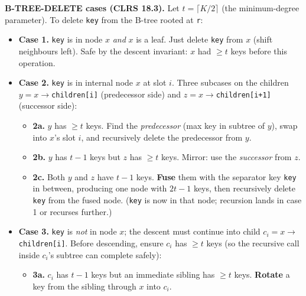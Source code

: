 \documentclass[11pt]{article}
\begin{document}
\begin{defnbox}
\textbf{B-TREE-DELETE cases (CLRS 18.3).} Let $t = \lceil K/2 \rceil$
(the minimum-degree parameter). To delete \texttt{key} from the
B-tree rooted at \texttt{r}:

\begin{itemize}[leftmargin=*]
    \item \textbf{Case 1.} \texttt{key} is in node $x$ \emph{and} $x$
          is a leaf. Just delete \texttt{key} from $x$ (shift
          neighbours left). Safe by the descent invariant: $x$ had
          $\ge t$ keys before this operation.
    \item \textbf{Case 2.} \texttt{key} is in internal node $x$ at
          slot $i$. Three subcases on the children $y =
          x\rightarrow$\texttt{children[i]} (predecessor side) and
          $z = x\rightarrow$\texttt{children[i+1]} (successor side):
          \begin{itemize}
              \item \textbf{2a.} $y$ has $\ge t$ keys. Find the
                    \emph{predecessor} (max key in subtree of $y$),
                    swap into $x$'s slot $i$, and recursively delete
                    the predecessor from $y$.
              \item \textbf{2b.} $y$ has $t-1$ keys but $z$ has
                    $\ge t$ keys. Mirror: use the \emph{successor}
                    from $z$.
              \item \textbf{2c.} Both $y$ and $z$ have $t-1$ keys.
                    \textbf{Fuse} them with the separator key
                    \texttt{key} in between, producing one node with
                    $2t-1$ keys, then recursively delete \texttt{key}
                    from the fused node. (\texttt{key} is now in
                    that node; recursion lands in case 1 or recurses
                    further.)
          \end{itemize}
    \item \textbf{Case 3.} \texttt{key} is \emph{not} in node $x$;
          the descent must continue into child
          $c_i = x\rightarrow$\texttt{children[i]}. Before
          descending, ensure $c_i$ has $\ge t$ keys (so the
          recursive call inside $c_i$'s subtree can complete
          safely):
          \begin{itemize}
              \item \textbf{3a.} $c_i$ has $t-1$ keys but an
                    immediate sibling has $\ge t$ keys. \textbf{Rotate}
                    a key from the sibling through $x$ into $c_i$.

\end{itemize}
\end{itemize}
\end{defnbox}
\end{document}
